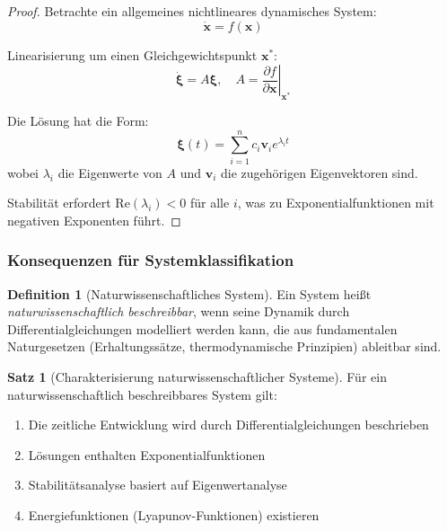 ﻿\documentclass[a4paper,12pt]{scrreprt}
\theoremstyle{definition}
\newtheorem{definition}{Definition}[section]
\newtheorem{satz}{Satz}[section]
\begin{document}
\begin{proof}
	Betrachte ein allgemeines nichtlineares dynamisches System:
	\begin{equation}
		\dot{\mathbf{x}} = f(\mathbf{x})
	\end{equation}
	
	Linearisierung um einen Gleichgewichtspunkt $\mathbf{x}^*$:
	\begin{equation}
		\dot{\mathbf{\xi}} = A \mathbf{\xi}, \quad A = \left. \frac{\partial f}{\partial \mathbf{x}} \right|_{\mathbf{x}^*}
	\end{equation}
	
	Die Lösung hat die Form:
	\begin{equation}
		\mathbf{\xi}(t) = \sum_{i=1}^{n} c_i \mathbf{v}_i e^{\lambda_i t}
	\end{equation}
	wobei $\lambda_i$ die Eigenwerte von $A$ und $\mathbf{v}_i$ die zugehörigen Eigenvektoren sind.
	
	Stabilität erfordert $\text{Re}(\lambda_i) < 0$ für alle $i$, was zu Exponentialfunktionen mit negativen Exponenten führt.
\end{proof}

\subsubsection{Konsequenzen für Systemklassifikation}

\begin{definition}[Naturwissenschaftliches System]
	Ein System heißt \textit{naturwissenschaftlich beschreibbar}, wenn seine Dynamik durch Differentialgleichungen modelliert werden kann, die aus fundamentalen Naturgesetzen (Erhaltungssätze, thermodynamische Prinzipien) ableitbar sind.
\end{definition}

\begin{satz}[Charakterisierung naturwissenschaftlicher Systeme]
	Für ein naturwissenschaftlich beschreibbares System gilt:
	\begin{enumerate}
		\item[-] Die zeitliche Entwicklung wird durch Differentialgleichungen beschrieben
		\item[-] Lösungen enthalten Exponentialfunktionen
		\item[-] Stabilitätsanalyse basiert auf Eigenwertanalyse
		\item[-] Energiefunktionen (Lyapunov-Funktionen) existieren
	\end{enumerate}
\end{satz}
\end{document}
